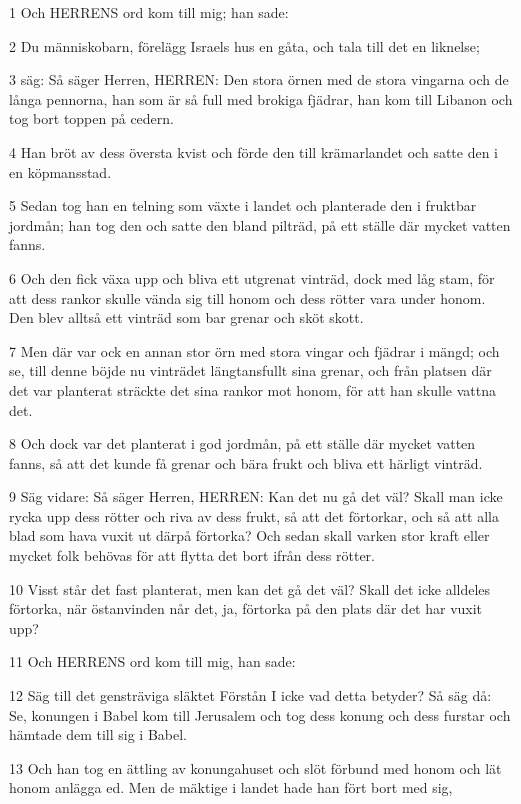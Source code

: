 \par 1 Och HERRENS ord kom till mig; han sade:
\par 2 Du människobarn, förelägg Israels hus en gåta, och tala till det en liknelse;
\par 3 säg: Så säger Herren, HERREN: Den stora örnen med de stora vingarna och de långa pennorna, han som är så full med brokiga fjädrar, han kom till Libanon och tog bort toppen på cedern.
\par 4 Han bröt av dess översta kvist och förde den till krämarlandet och satte den i en köpmansstad.
\par 5 Sedan tog han en telning som växte i landet och planterade den i fruktbar jordmån; han tog den och satte den bland pilträd, på ett ställe där mycket vatten fanns.
\par 6 Och den fick växa upp och bliva ett utgrenat vinträd, dock med låg stam, för att dess rankor skulle vända sig till honom och dess rötter vara under honom. Den blev alltså ett vinträd som bar grenar och sköt skott.
\par 7 Men där var ock en annan stor örn med stora vingar och fjädrar i mängd; och se, till denne böjde nu vinträdet längtansfullt sina grenar, och från platsen där det var planterat sträckte det sina rankor mot honom, för att han skulle vattna det.
\par 8 Och dock var det planterat i god jordmån, på ett ställe där mycket vatten fanns, så att det kunde få grenar och bära frukt och bliva ett härligt vinträd.
\par 9 Säg vidare: Så säger Herren, HERREN: Kan det nu gå det väl? Skall man icke rycka upp dess rötter och riva av dess frukt, så att det förtorkar, och så att alla blad som hava vuxit ut därpå förtorka? Och sedan skall varken stor kraft eller mycket folk behövas för att flytta det bort ifrån dess rötter.
\par 10 Visst står det fast planterat, men kan det gå det väl? Skall det icke alldeles förtorka, när östanvinden når det, ja, förtorka på den plats där det har vuxit upp?
\par 11 Och HERRENS ord kom till mig, han sade:
\par 12 Säg till det gensträviga släktet Förstån I icke vad detta betyder? Så säg då: Se, konungen i Babel kom till Jerusalem och tog dess konung och dess furstar och hämtade dem till sig i Babel.
\par 13 Och han tog en ättling av konungahuset och slöt förbund med honom och lät honom anlägga ed. Men de mäktige i landet hade han fört bort med sig,
